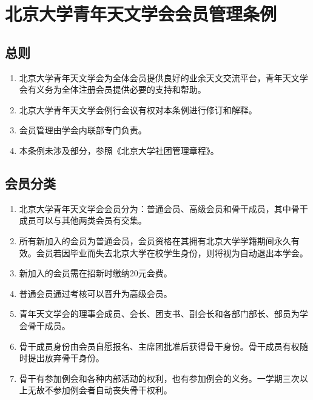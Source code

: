\chapter{北京大学青年天文学会会员管理条例}

\section{总则}

\begin{enumerate}
    \item 北京大学青年天文学会为全体会员提供良好的业余天文交流平台，青年天文学会有义务为全体注册会员提供必要的支持和帮助。
    
    \item 北京大学青年天文学会例行会议有权对本条例进行修订和解释。
    
    \item 会员管理由学会内联部专门负责。
    
    \item 本条例未涉及部分，参照《北京大学社团管理章程》。
\end{enumerate}

\section{会员分类}

\begin{enumerate}[resume]
    \item 北京大学青年天文学会会员分为：普通会员、高级会员和骨干成员，其中骨干成员可以与其他两类会员有交集。
    
    \item 所有新加入的会员为普通会员，会员资格在其拥有北京大学学籍期间永久有效。会员若因毕业而失去北京大学在校学生身份，则将视为自动退出本学会。
    
    \item 新加入的会员需在招新时缴纳20元会费。
    
    \item 普通会员通过考核可以晋升为高级会员。
    
    \item 青年天文学会的理事会成员、会长、团支书、副会长和各部门部长、部员为学会骨干成员。
    
    \item 骨干成员身份由会员自愿报名、主席团批准后获得骨干身份。骨干成员有权随时提出放弃骨干身份。
    
    \item 骨干有参加例会和各种内部活动的权利，也有参加例会的义务。一学期三次以上无故不参加例会者自动丧失骨干权利。
\end{enumerate}

